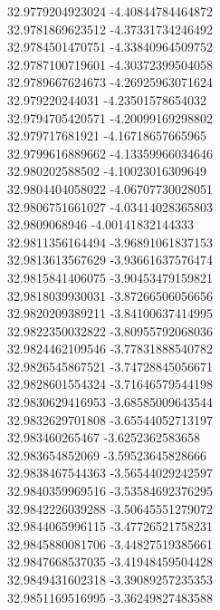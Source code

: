 {32.9779204923024	-4.40844784464872\\
32.9781869623512	-4.37331734246492\\
32.9784501470751	-4.33840964509752\\
32.9787100719601	-4.30372399504058\\
32.9789667624673	-4.26925963071624\\
32.979220244031	-4.23501578654032\\
32.9794705420571	-4.20099169298802\\
32.979717681921	-4.16718657665965\\
32.9799616889662	-4.13359966034646\\
32.980202588502	-4.10023016309649\\
32.9804404058022	-4.06707730028051\\
32.9806751661027	-4.03414028365803\\
32.9809068946	-4.00141832144333\\
32.9811356164494	-3.96891061837153\\
32.9813613567629	-3.93661637576474\\
32.9815841406075	-3.90453479159821\\
32.9818039930031	-3.87266506056656\\
32.9820209389211	-3.84100637414995\\
32.9822350032822	-3.80955792068036\\
32.9824462109546	-3.77831888540782\\
32.9826545867521	-3.74728845056671\\
32.9828601554324	-3.71646579544198\\
32.9830629416953	-3.68585009643544\\
32.9832629701808	-3.65544052713197\\
32.983460265467	-3.6252362583658\\
32.983654852069	-3.59523645828666\\
32.9838467544363	-3.56544029242597\\
32.9840359969516	-3.53584692376295\\
32.9842226039288	-3.50645551279072\\
32.9844065996115	-3.47726521758231\\
32.9845880081706	-3.44827519385661\\
32.9847668537035	-3.41948459504428\\
32.9849431602318	-3.39089257235353\\
32.9851169516995	-3.36249827483588\\
}
